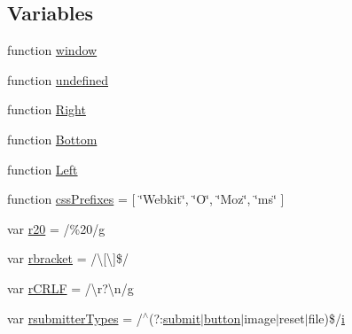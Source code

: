 \subsection*{Variables}
\begin{DoxyCompactItemize}
\item 
function \hyperlink{_bibabook_2_scripts_2jquery-1_810_82_8js_a04a8a2bbfa9c15500892b8e5033d625b}{window}
\item 
function \hyperlink{_bibabook_2_scripts_2jquery-1_810_82_8js_a08113a236cc18d2a9d5ce27e638012be}{undefined}
\item 
function \hyperlink{_bibabook_2_scripts_2jquery-1_810_82_8js_ac7f66efc33d974809d85fc5bdb00c6eb}{Right}
\item 
function \hyperlink{_bibabook_2_scripts_2jquery-1_810_82_8js_aff76c1cba4a00c678dfce0e0c5a5538a}{Bottom}
\item 
function \hyperlink{_bibabook_2_scripts_2jquery-1_810_82_8js_abef68bf244a1159a49fe3a2c153a65d2}{Left}
\item 
function \hyperlink{_bibabook_2_scripts_2jquery-1_810_82_8js_a2ed3892172b336458b8074254f4471da}{css\+Prefixes} = \mbox{[} \char`\"{}Webkit\char`\"{}, \char`\"{}O\char`\"{}, \char`\"{}Moz\char`\"{}, \char`\"{}ms\char`\"{} \mbox{]}
\item 
var \hyperlink{_bibabook_2_scripts_2jquery-1_810_82_8js_a0e39f72d512af99fb5992d66f1a1c821}{r20} = /\%20/\hyperlink{packages_2_respond_81_82_80_2content_2_scripts_2respond_8min_8js_a103df269476e78897c9c4c6cb8f4eb06}{g}
\item 
var \hyperlink{_bibabook_2_scripts_2jquery-1_810_82_8js_a07117e28ee58d2d2664cfbaf741e10c1}{rbracket} = /\textbackslash{}\mbox{[}\textbackslash{}\mbox{]}\$/
\item 
var \hyperlink{_bibabook_2_scripts_2jquery-1_810_82_8js_a4fd9dfc4eb645b441a3e84730c50154b}{r\+C\+R\+L\+F} = /\textbackslash{}r?\textbackslash{}n/\hyperlink{packages_2_respond_81_82_80_2content_2_scripts_2respond_8min_8js_a103df269476e78897c9c4c6cb8f4eb06}{g}
\item 
var \hyperlink{_bibabook_2_scripts_2jquery-1_810_82_8js_a0e9cd4ca08945afe827846f34a36c74a}{rsubmitter\+Types} = /$^\wedge$(?\+:\hyperlink{jquery-1_810_82-vsdoc_8js_a58af54f4f7137a051db7e3e27bdfe1b5}{submit}$\vert$\hyperlink{packages_2bootstrap_83_80_80_2content_2_scripts_2bootstrap_8min_8js_a55e170814e74f6c3db8ae9ea3ba9054f}{button}$\vert$image$\vert$reset$\vert$file)\$/\hyperlink{packages_2_respond_81_82_80_2content_2_scripts_2respond_8min_8js_a5e25b1d1bed9ab5f3174b76d6a722180}{i}
\item 

\end{DoxyCompactItemize}
